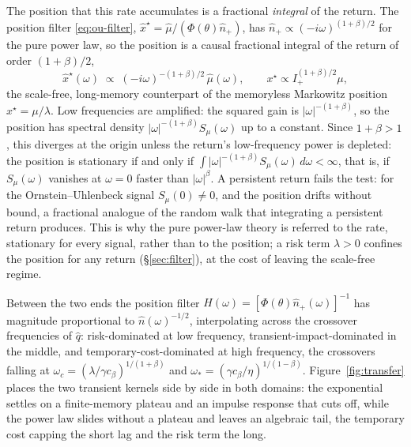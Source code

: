 \documentclass[11pt]{article}
\theoremstyle{plain}
\theoremstyle{definition}
\theoremstyle{remark}
\begin{document}
The position that this rate accumulates is a fractional \emph{integral} of the return. The position filter \eqref{eq:ou-filter}, $\hat x^\star=\hat\mu/(\Phi(\theta)\hat n_+)$, has $\hat n_+\propto(-i\omega)^{(1+\beta)/2}$ for the pure power law, so the position is a causal fractional integral of the return of order $(1+\beta)/2$,
\begin{equation}\label{eq:fracpos}
\hat x^\star(\omega) \;\propto\; (-i\omega)^{-(1+\beta)/2}\,\hat\mu(\omega), \qquad x^\star \propto I^{(1+\beta)/2}_+\mu,
\end{equation}
the scale-free, long-memory counterpart of the memoryless Markowitz position $x^\star=\mu/\lambda$. Low frequencies are amplified: the squared gain is $|\omega|^{-(1+\beta)}$, so the position has spectral density $|\omega|^{-(1+\beta)}S_\mu(\omega)$ up to a constant. Since $1+\beta>1$, this diverges at the origin unless the return's low-frequency power is depleted: the position is stationary if and only if $\int|\omega|^{-(1+\beta)}S_\mu(\omega)\,d\omega<\infty$, that is, if $S_\mu(\omega)$ vanishes at $\omega=0$ faster than $|\omega|^\beta$. A persistent return fails the test: for the Ornstein--Uhlenbeck signal $S_\mu(0)\ne0$, and the position drifts without bound, a fractional analogue of the random walk that integrating a persistent return produces. This is why the pure power-law theory is referred to the rate, stationary for every signal, rather than to the position; a risk term $\lambda>0$ confines the position for any return (\S\ref{sec:filter}), at the cost of leaving the scale-free regime.

Between the two ends the position filter $H(\omega)=[\Phi(\theta)\hat n_+(\omega)]^{-1}$ has magnitude proportional to $\hat n(\omega)^{-1/2}$, interpolating across the crossover frequencies of $\hat q$: risk-dominated at low frequency, transient-impact-dominated in the middle, and temporary-cost-dominated at high frequency, the crossovers falling at $\omega_c=(\lambda/\gamma c_\beta)^{1/(1+\beta)}$ and $\omega_*=(\gamma c_\beta/\eta)^{1/(1-\beta)}$. Figure~\ref{fig:transfer} places the two transient kernels side by side in both domains: the exponential settles on a finite-memory plateau and an impulse response that cuts off, while the power law slides without a plateau and leaves an algebraic tail, the temporary cost capping the short lag and the risk term the long.
\end{document}
